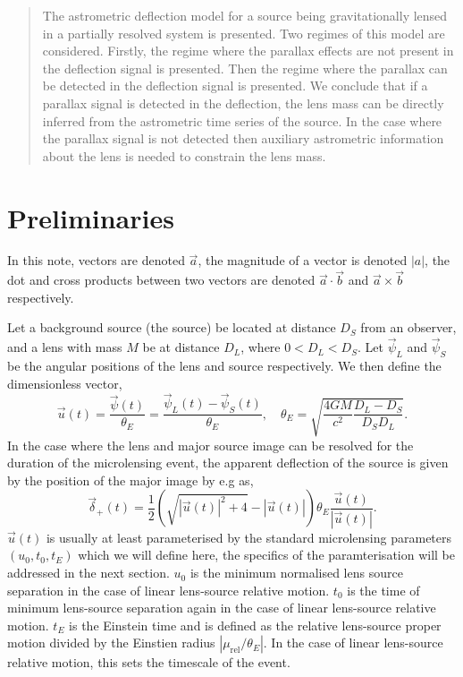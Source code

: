 \documentclass[11pt]{article}
\begin{document}
\maketitle

\begin{abstract}

The astrometric deflection model for a source being gravitationally lensed in a partially
resolved system is presented. Two regimes of this model are considered. Firstly,
the regime where the parallax effects are not present in the deflection signal is presented.
Then the regime where the parallax can be detected in the deflection signal is presented.
We conclude that if a parallax signal is detected in the deflection, the lens mass can be
directly inferred from the astrometric time series of the source. In the case where the
parallax signal is not detected then auxiliary astrometric information about the lens
is needed to constrain the lens mass.

\end{abstract}

\section{Preliminaries}
In this note, vectors are denoted $\vec{a}$, the magnitude of a vector is denoted $|a|$, 
the dot and cross products between two vectors are denoted $\vec{a}\cdot\vec{b}$ and 
$\vec{a}\times\vec{b}$ respectively.


Let a background source (the source) be located at distance $D_{S}$ from an observer, 
and a lens with mass $M$ be at distance $D_{L}$, where $0<D_{L}<D_{S}$. Let 
$\vec{\psi}_{L}$ and $\vec{\psi}_{S}$ be the angular positions of the lens and source 
respectively. We then define the dimensionless vector,
%
\begin{equation}
\vec{u}(t) = \frac{\vec{\psi}(t)}{\theta_{E}} = 
          \frac{\vec{\psi}_{L}(t)-\vec{\psi}_{S}(t)}{\theta_{E}}, 
          \quad \theta_{E} = \sqrt{\frac{4GM}{c^{2}}\frac{D_{L}-D_{S}}{D_{S}D_{L}}}.
\end{equation}
%
In the case where the lens and major source image can be resolved for the duration 
of the microlensing event, the apparent deflection of the source is given by the 
position of the major image by e.g \cite{Bramich18} as,
%
\begin{equation}
\vec{\delta}_{+}(t) = \frac{1}{2}\left(\sqrt{|\vec{u}(t)|^{2}+4}-|\vec{u}(t)|\right)
                   \theta_{E}\frac{\vec{u}(t)}{|\vec{u}(t)|}.
\label{eq:shift}
\end{equation}
%
$\vec{u}(t)$ is usually at least parameterised by the standard microlensing parameters 
$(u_{0},t_{0},t_{E})$ which we will define here, the specifics of the 
paramterisation will be addressed in the next section. $u_{0}$ is the minimum 
normalised lens source separation in the case of linear lens-source relative
motion. $t_{0}$ is the time of minimum lens-source separation again in the case 
of linear lens-source relative motion. $t_{E}$ is the Einstein time and is defined as the 
relative lens-source proper motion divided by the Einstien radius 
$|\mu_{\text{rel}}/\theta_{E}|$. In the case of linear lens-source relative motion, this
sets the timescale of the event. 
%
\end{document}
